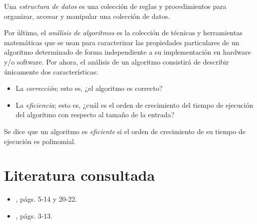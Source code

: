 Una \emph{estructura de datos} es una colección de reglas y procedimientos para organizar, accesar y manipular una colección de datos.

Por último,  el \emph{análisis de algoritmos} es la colección de técnicas y herramientas matemáticas que se usan para caracterizar las propiedades particulares de un algoritmo determinado de forma independiente a su implementación en hardware y/o software. 
Por ahora, el análisis de un algoritmo consistirá de describir únicamente dos características:

\begin{itemize}
  \item La \emph{corrección}; esto es, ¿el algoritmo es correcto?
  \item La \emph{eficiencia}; esto es, ¿cuál es el orden de crecimiento del 
  tiempo de ejecución del algoritmo con respecto al tamaño de la entrada?
\end{itemize}
Se dice que un algoritmo es \emph{eficiente} si el orden de crecimiento
de su tiempo de ejecución es polinomial.


\section*{Literatura consultada}

\begin{itemize}
  \item \textcite{cormen_introduction_2009}, págs. 5-14 y 20-22.
  \item \textcite{skiena_algorithm_2011}, págs. 3-13.
\end{itemize}
